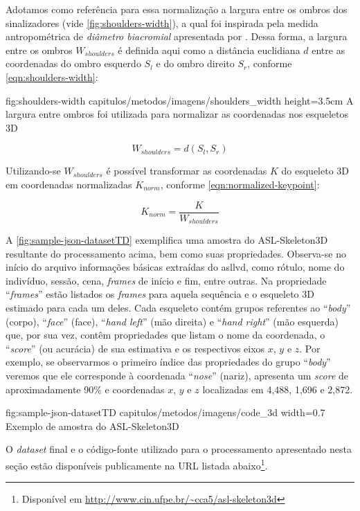 \begin{enumerate}
          Adotamos como referência para essa normalização a largura entre os ombros dos sinalizadores (vide \autoref{fig:shoulders-width}), a qual foi inspirada pela medida antropométrica de \textit{diâmetro biacromial} apresentada por . Dessa forma, a largura entre os ombros \(W_{shoulders}\) é definida aqui como a distância euclidiana \(d\) entre as coordenadas do ombro esquerdo \(S_{l}\) e do ombro direito \(S_ {r}\), conforme \autoref{eqn:shoulders-width}:

          \figura
          {fig:shoulders-width} %
          {capitulos/metodos/imagens/shoulders_width} %
          {height=3.5cm} %
          {A largura entre ombros foi utilizada para normalizar as coordenadas nos esqueletos 3D} %
          {} %

          \begin{equation}
              \label{eqn:shoulders-width}
              W_{shoulders} = d\left(S_{l}, S_{r}\right)
          \end{equation}

          Utilizando-se \(W_{shoulders}\) é possível transformar as coordenadas \(K\) do esqueleto 3D em coordenadas normalizadas \(K_{norm}\), conforme \autoref{eqn:normalized-keypoint}:

          \begin{equation}
              \label{eqn:normalized-keypoint}
              K_{norm} = \frac{K}{W_{shoulders}}
          \end{equation}

\end{enumerate}


A \autoref{fig:sample-json-datasetTD} exemplifica uma amostra do ASL-Skeleton3D resultante do processamento acima, bem como suas propriedades. Observa-se no início do arquivo informações básicas extraídas do \acrshort{asllvd}, como rótulo, nome do indivíduo, sessão, cena, \textit{frames} de início e fim, entre outras. Na propriedade ``\textit{frames}'' estão listados os \textit{frames} para aquela sequência e o esqueleto 3D estimado para cada um deles. Cada esqueleto contém grupos referentes ao ``\textit{body}'' (corpo), ``\textit{face}'' (face), ``\textit{hand left}'' (mão direita) e ``\textit{hand right}'' (mão esquerda) que, por sua vez, contêm propriedades que listam o nome da coordenada, o ``\textit{score}'' (ou acurácia) de sua estimativa e os respectivos eixos \(x\), \(y\) e \(z\).
Por exemplo, se observarmos o primeiro índice das propriedades do grupo ``\textit{body}'' veremos que ele corresponde à coordenada ``\textit{nose}'' (nariz), apresenta um \textit{score} de aproximadamente 90\% e coordenadas \(x\), \(y\) e \(z\) localizadas em 4,488, 1,696 e 2,872.

\figura
{fig:sample-json-datasetTD} %
{capitulos/metodos/imagens/code_3d} %
{width=0.7\linewidth} %
{Exemplo de amostra do ASL-Skeleton3D} %
{} %

O \textit{dataset} final e o código-fonte utilizado para o processamento apresentado nesta seção estão disponíveis publicamente na URL listada abaixo\footnote{Disponível em \url{http://www.cin.ufpe.br/~cca5/asl-skeleton3d}}.
